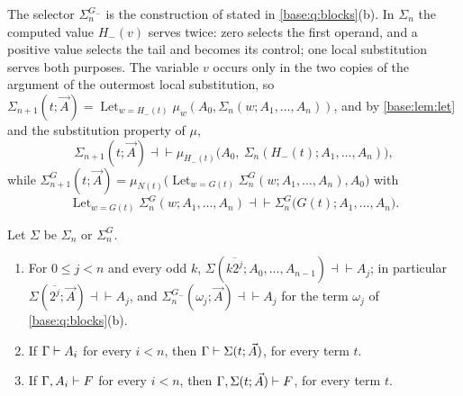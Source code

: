 The selector $\Sigma^{G_-}_n$ is the construction of 
stated in \cref{base:q:blocks}(b).  In $\Sigma_n$ the computed value
$H_-(v)$ serves twice: zero selects the first operand, and a positive value
selects the tail and becomes its control; one local substitution serves
both purposes.  The variable $v$ occurs only in the two copies of the
argument of the outermost local substitution, so
$\Sigma_{n+1}(t;\vec A)=\operatorname{Let}_{w=H_-(t)}\mu_w(A_0,\Sigma_n(w;A_1,\dots,A_n))$,
and by \cref{base:lem:let} and the substitution property of $\mu$,
\begin{equation}
 \Sigma_{n+1}(t;\vec A)\dashv\vdash
 \mu_{H_-(t)}\bigl(A_0,\ \Sigma_n(H_-(t);A_1,\dots,A_n)\bigr),
 \label{base:eq:fused-unfold}
\end{equation}
while
$\Sigma^{G}_{n+1}(t;\vec A)=\mu_{N(t)}\bigl(\operatorname{Let}_{w=G(t)}
 \Sigma^{G}_n(w;A_1,\dots,A_n),A_0\bigr)$ with
\begin{equation}
 \operatorname{Let}_{w=G(t)}\Sigma^{G}_n(w;A_1,\dots,A_n)\dashv\vdash
 \Sigma^{G}_n\bigl(G(t);A_1,\dots,A_n\bigr).
 \label{base:eq:separate-unfold}
\end{equation}

\begin{theorem}
\label{base:thm:fused-select}
Let $\Sigma$ be $\Sigma_n$ or $\Sigma^{G}_n$.
\begin{enumerate}[label=\textup{(\roman*)}]
\item For $0\le j<n$ and every odd $k$,
 $\Sigma(\overline{k2^{j}};A_0,\dots,A_{n-1})\dashv\vdash A_j$; in
 particular $\Sigma(\overline{2^j};\vec A)\dashv\vdash A_j$, and
 $\Sigma^{G_-}_n(\omega_j;\vec A)\dashv\vdash A_j$ for the term $\omega_j$ of
 \cref{base:q:blocks}(b).
\item If $\Gamma\vdash A_i$ for every $i<n$, then
 $\Gamma\vdash\Sigma(t;\vec A)$, for every term $t$.
\item If $\Gamma,A_i\vdash F$ for every $i<n$, then
 $\Gamma,\Sigma(t;\vec A)\vdash F$, for every term $t$.
\end{enumerate}
\end{theorem}

